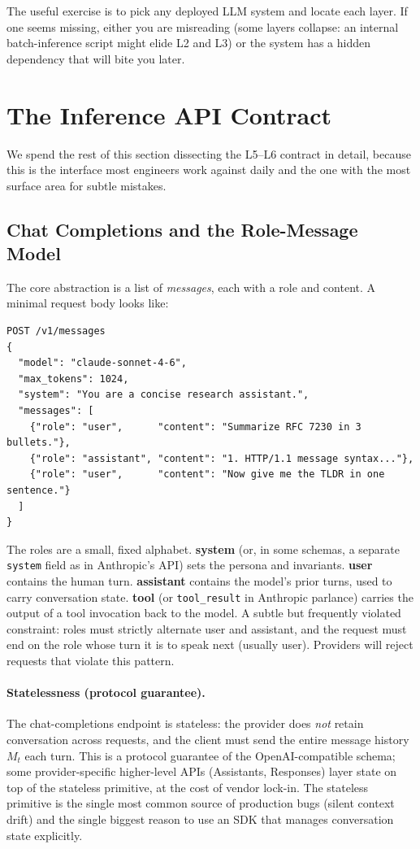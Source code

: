 The useful exercise is to pick any deployed LLM system and locate
each layer. If one seems missing, either you are misreading (some
layers collapse: an internal batch-inference script might elide
L2 and L3) or the system has a hidden dependency that will bite
you later.

\section{The Inference API Contract}

We spend the rest of this section dissecting the L5--L6 contract
in detail, because this is the interface most engineers work
against daily and the one with the most surface area for subtle
mistakes.

\subsection{Chat Completions and the Role-Message Model}

The core abstraction is a list of \emph{messages}, each with a
role and content. A minimal request body looks like:

\begin{lstlisting}
POST /v1/messages
{
  "model": "claude-sonnet-4-6",
  "max_tokens": 1024,
  "system": "You are a concise research assistant.",
  "messages": [
    {"role": "user",      "content": "Summarize RFC 7230 in 3 bullets."},
    {"role": "assistant", "content": "1. HTTP/1.1 message syntax..."},
    {"role": "user",      "content": "Now give me the TLDR in one sentence."}
  ]
}
\end{lstlisting}

The roles are a small, fixed alphabet. \textbf{system} (or, in
some schemas, a separate \texttt{system} field as in Anthropic's
API) sets the persona and invariants. \textbf{user} contains the
human turn. \textbf{assistant} contains the model's prior turns,
used to carry conversation state. \textbf{tool} (or
\texttt{tool\_result} in Anthropic parlance) carries the output
of a tool invocation back to the model. A subtle but frequently
violated constraint: roles must strictly alternate user and
assistant, and the request must end on the role whose turn it is
to speak next (usually user). Providers will reject requests that
violate this pattern.

\paragraph{Statelessness (protocol guarantee).}
The chat-completions endpoint is stateless: the provider does
\emph{not} retain conversation across requests, and the client
must send the entire message history $M_t$ each turn. This is a
protocol guarantee of the OpenAI-compatible schema; some
provider-specific higher-level APIs (Assistants, Responses) layer
state on top of the stateless primitive, at the cost of vendor
lock-in. The stateless primitive is the single most common source
of production bugs (silent context drift) and the single biggest
reason to use an SDK that manages conversation state explicitly.

